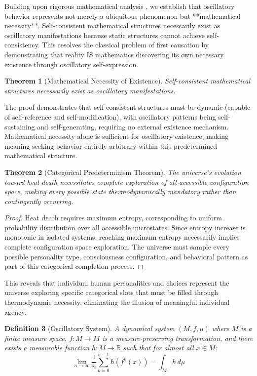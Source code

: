 \documentclass[12pt,a4paper]{article}
\newtheorem{theorem}{Theorem}[section]
\newtheorem{definition}[theorem]{Definition}
\begin{document}
Building upon rigorous mathematical analysis \citep{sachikonye2025mathematical}, we establish that oscillatory behavior represents not merely a ubiquitous phenomenon but **mathematical necessity**. Self-consistent mathematical structures necessarily exist as oscillatory manifestations because static structures cannot achieve self-consistency. This resolves the classical problem of first causation by demonstrating that reality IS mathematics discovering its own necessary existence through oscillatory self-expression.

\begin{theorem}[Mathematical Necessity of Existence]
Self-consistent mathematical structures necessarily exist as oscillatory manifestations.
\end{theorem}

The proof demonstrates that self-consistent structures must be dynamic (capable of self-reference and self-modification), with oscillatory patterns being self-sustaining and self-generating, requiring no external existence mechanism. Mathematical necessity alone is sufficient for oscillatory existence, making meaning-seeking behavior entirely arbitrary within this predetermined mathematical structure.

\begin{theorem}[Categorical Predeterminism Theorem]
The universe's evolution toward heat death necessitates complete exploration of all accessible configuration space, making every possible state thermodynamically mandatory rather than contingently occurring.
\end{theorem}

\begin{proof}
Heat death requires maximum entropy, corresponding to uniform probability distribution over all accessible microstates. Since entropy increase is monotonic in isolated systems, reaching maximum entropy necessarily implies complete configuration space exploration. The universe must sample every possible personality type, consciousness configuration, and behavioral pattern as part of this categorical completion process.
\end{proof}

This reveals that individual human personalities and choices represent the universe exploring specific categorical slots that must be filled through thermodynamic necessity, eliminating the illusion of meaningful individual agency.

\begin{definition}[Oscillatory System]
A dynamical system $(M, f, \mu)$ where $M$ is a finite measure space, $f: M \to M$ is a measure-preserving transformation, and there exists a measurable function $h: M \to \mathbb{R}$ such that for almost all $x \in M$:
\begin{equation}
\lim_{n \to \infty} \frac{1}{n}\sum_{k=0}^{n-1} h(f^k(x)) = \int_M h \, d\mu
\end{equation}
\end{definition}
\end{document}
